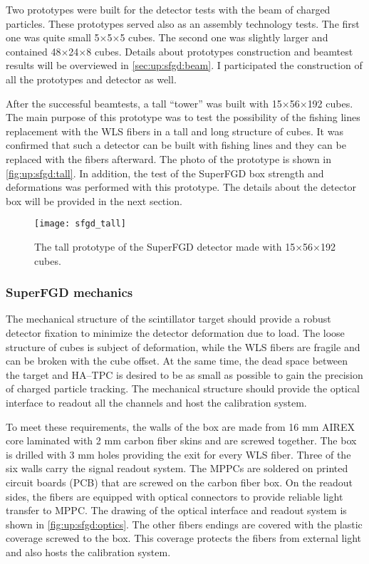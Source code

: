 \documentclass[main.tex]{subfiles}
\begin{document}
Two prototypes were built for the detector tests with the beam of charged particles. These prototypes served also as an assembly technology tests. The first one was quite small 5$\times$5$\times$5 cubes. The second one was slightly larger and contained 48$\times$24$\times$8 cubes. Details about prototypes construction and beamtest results will be overviewed in \autoref{sec:up:sfgd:beam}. I participated the construction of all the prototypes and detector as well. 

After the successful beamtests, a tall ``tower'' was built with 15$\times$56$\times$192 cubes. The main purpose of this prototype was to test the possibility of the fishing lines replacement with the WLS fibers in a tall and long structure of cubes. It was confirmed that such a detector can be built with fishing lines and they can be replaced with the fibers afterward. The photo of the prototype is shown in \autoref{fig:up:sfgd:tall}. In addition, the test of the SuperFGD box strength and deformations was performed with this prototype. The details about the detector box will be provided in the next section.

\begin{figure}[!ht]
	\centering
	\texttt{[image: sfgd\_tall]}
	\caption{The tall prototype of the SuperFGD detector made with 15$\times$56$\times$192 cubes.}
	\label{fig:up:sfgd:tall}
\end{figure}

\subsubsection{SuperFGD mechanics}
The mechanical structure of the scintillator target should provide a robust detector fixation to minimize the detector deformation due to load. The loose structure of cubes is subject of deformation, while the WLS fibers are fragile and can be broken with the cube offset. At the same time, the dead space between the target and HA--TPC is desired to be as small as possible to gain the precision of charged particle tracking. The mechanical structure should provide the optical interface to readout all the channels and host the calibration system.

To meet these requirements, the walls of the box are made from 16 mm AIREX core laminated with 2 mm carbon fiber skins and are screwed together. The box is drilled with 3 mm holes providing the exit for every WLS fiber. Three of the six walls carry the signal readout system. The MPPCs are soldered on printed circuit boards (PCB) that are screwed on the carbon fiber box. On the readout sides, the fibers are equipped with optical connectors to provide reliable light transfer to MPPC. The drawing of the optical interface and readout system is shown in \autoref{fig:up:sfgd:optics}. The other fibers endings are covered with the plastic coverage screwed to the box. This coverage protects the fibers from external light and also hosts the calibration system.
\end{document}
